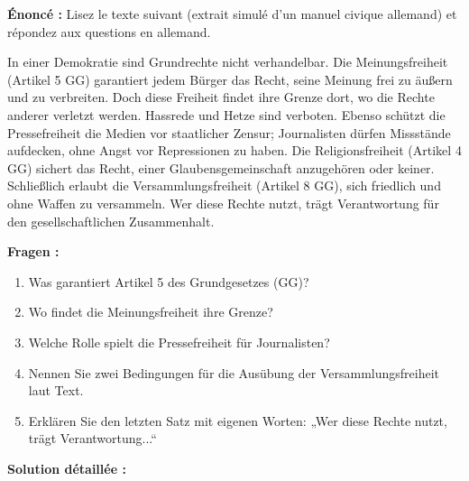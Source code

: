 \documentclass[11pt]{article}
\begin{document}
\begin{exoresolu}
\textbf{Énoncé :} Lisez le texte suivant (extrait simulé d'un manuel civique allemand) et répondez aux questions en allemand.

\begin{textebox}
In einer Demokratie sind Grundrechte nicht verhandelbar. Die Meinungsfreiheit (Artikel 5 GG) garantiert jedem Bürger das Recht, seine Meinung frei zu äußern und zu verbreiten. Doch diese Freiheit findet ihre Grenze dort, wo die Rechte anderer verletzt werden. Hassrede und Hetze sind verboten. Ebenso schützt die Pressefreiheit die Medien vor staatlicher Zensur; Journalisten dürfen Missstände aufdecken, ohne Angst vor Repressionen zu haben. Die Religionsfreiheit (Artikel 4 GG) sichert das Recht, einer Glaubensgemeinschaft anzugehören oder keiner. Schließlich erlaubt die Versammlungsfreiheit (Artikel 8 GG), sich friedlich und ohne Waffen zu versammeln. Wer diese Rechte nutzt, trägt Verantwortung für den gesellschaftlichen Zusammenhalt.
\end{textebox}

\textbf{Fragen :}
\begin{enumerate}
    \item Was garantiert Artikel 5 des Grundgesetzes (GG)?
    \item Wo findet die Meinungsfreiheit ihre Grenze?
    \item Welche Rolle spielt die Pressefreiheit für Journalisten?
    \item Nennen Sie zwei Bedingungen für die Ausübung der Versammlungsfreiheit laut Text.
    \item Erklären Sie den letzten Satz mit eigenen Worten: „Wer diese Rechte nutzt, trägt Verantwortung...“
\end{enumerate}

\tcblower
\textbf{Solution détaillée :}


\end{exoresolu}
\end{document}

